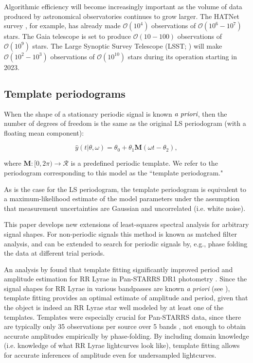 \documentclass[apj]{emulateapj}
\newcommand{\bigO}{\mathcal{O}}
\begin{document}
Algorithmic efficiency will become increasingly important as the volume
of data produced by astronomical observatories continues to grow larger. The HATNet survey
\citep{HATNet}, for example, has already made $\bigO(10^4)$ observations of
$\bigO(10^6-10^7)$ stars. The Gaia telescope \citep{GAIA} is set to produce $\bigO(10-100)$
observations of $\bigO(10^9)$ stars. The Large Synoptic Survey Telescope (LSST; \cite{LSST})
will make $\bigO(10^2-10^3)$ observations of $\bigO(10^{10})$ stars during its operation starting in 2023.


\subsection{Template periodograms}

When the shape of a stationary periodic signal is known $\emph{a priori}$, then the number of degrees of freedom is the same as the original LS periodogram (with a floating mean component):

\begin{equation}
    \hat{y}(t|\theta, \omega) = \theta_0 + \theta_1 \mathbf{M}(\omega t - \theta_2),
\end{equation}

where $\mathbf{M}:[0, 2\pi)\rightarrow \mathcal{R}$ is a predefined periodic template.
We refer to the periodogram corresponding to this model as the ``template periodogram."

As is the case for the LS periodogram, the template periodogram
is equivalent to a maximum-likelihood estimate of the model parameters under the assumption that
measurement uncertainties are Gaussian and uncorrelated (i.e. white noise).

This paper develops new extensions of least-squares spectral analysis for arbitrary
signal shapes. For non-periodic signals this method is known as matched filter analysis,
and can be extended to search for periodic signals by, e.g., phase folding the data
at different trial periods.

An analysis by \cite{Sesar_etal_2016} found that template fitting significantly improved
period and amplitude estimation for RR Lyrae in Pan-STARRS DR1 photometry \citep{PanSTARRS}. Since the signal
shapes for RR Lyrae in various bandpasses are known \emph{a priori} (see \cite{Sesar_etal_2010}),
template fitting provides an optimal estimate of amplitude and period,
given that the object is indeed an RR Lyrae star well modeled by at least one of the templates.
Templates were especially crucial for Pan-STARRS data, since there are typically only
35 observations per source over 5 bands \citep{Hernitschek_etal_2016}, not enough to obtain
accurate amplitudes empirically by phase-folding. By including domain knowledge (i.e. knowledge of what RR Lyrae
lightcurves look like), template fitting allows for accurate inferences of amplitude even
for undersampled lightcurves.
\end{document}
